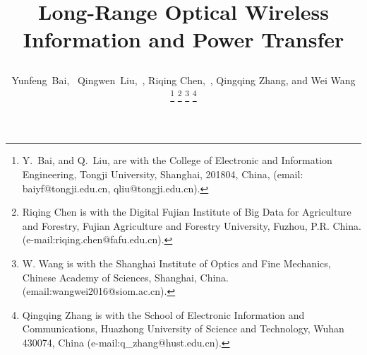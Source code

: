 \documentclass{IEEEtran}
\begin{document}
\title{\begin{Huge}Long-Range Optical Wireless Information and Power Transfer\end{Huge}}
\author{
\begin{normalsize}
Yunfeng~Bai,~%
Qingwen~Liu,~,
Riqing Chen,~, Qingqing Zhang, and Wei Wang   %
\end{normalsize}
\thanks{Y.~Bai, and Q.~Liu, are with the College of Electronic and Information Engineering, Tongji University, Shanghai, 201804, China, (email: baiyf@tongji.edu.cn, qliu@tongji.edu.cn). }%
\thanks{Riqing Chen is with the Digital Fujian Institute of Big Data for Agriculture and Forestry, Fujian Agriculture and Forestry University, Fuzhou, P.R. China.(e-mail:riqing.chen@fafu.edu.cn).}
\thanks{W. Wang is with the Shanghai Institute of Optics and Fine Mechanics, Chinese Academy of Sciences, Shanghai, China. (email:wangwei2016@siom.ac.cn).
}
\thanks{Qingqing Zhang is with the School of Electronic Information and Communications, Huazhong University of Science and Technology, Wuhan 430074, China (e-mail:q\_zhang@hust.edu.cn). }
}

\maketitle
\end{document}
